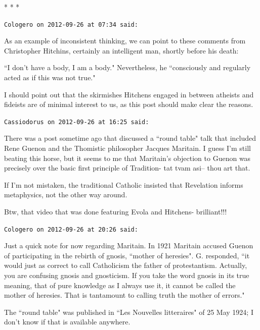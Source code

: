
\begin{center}* * *\end{center}

\begin{footnotesize}\begin{sffamily}



\texttt{Cologero on 2012-09-26 at 07:34 said: }

As an example of inconsistent thinking, we can point to these comments from Christopher Hitchins, certainly an intelligent man, shortly before his death: 

``I don't have a body, I am a body." Nevertheless, he ``consciously and regularly acted as if this was not true."

I should point out that the skirmishes Hitchens engaged in between atheists and fideists are of minimal interest to us, as this post should make clear the reasons.


\hfill

\texttt{Cassiodorus on 2012-09-26 at 16:25 said: }

There was a post sometime ago that discussed a ``round table" talk that included Rene Guenon and the Thomistic philosopher Jacques Maritain. I guess I'm still beating this horse, but it seems to me that Maritain's objection to Guenon was precisely over the basic first principle of Tradition- tat tvam asi– thou art that.

If I'm not mistaken, the traditional Catholic insisted that Revelation informs metaphysics, not the other way around.

Btw, that video that was done featuring Evola and Hitchens- brilliant!!!


\hfill

\texttt{Cologero on 2012-09-26 at 20:26 said: }

Just a quick note for now regarding Maritain. In 1921 Maritain accused Guenon of participating in the rebirth of gnosis, ``mother of heresies". G. responded, ``it would just as correct to call Catholicism the father of protestantism. Actually, you are confusing gnosis and gnosticism. If you take the word gnosis in its true meaning, that of pure knowledge as I always use it, it cannot be called the mother of heresies. That is tantamount to calling truth the mother of errors."

The ``round table" was published in ``Les Nouvelles litteraires" of 25 May 1924; I don't know if that is available anywhere.


\end{sffamily}
\end{footnotesize}
